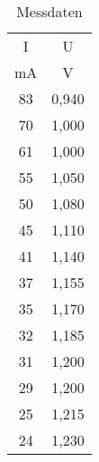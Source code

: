 

\begin{table}
  \centering
  \caption{Messdaten}
  \label{tab:some_data}
  \begin{tabular}{c c }
    \toprule
     I &	 U	   \\
     mA &  V  \\
    \midrule
   83  & 0,940	\\
   70  & 1,000	\\
   61  & 1,000	\\
   55  & 1,050	\\
   50  & 1,080	\\
   45  & 1,110	\\
   41  & 1,140	\\
   37  & 1,155	\\
   35  & 1,170	\\
   32  & 1,185	\\
   31  & 1,200 \\
   29  & 1,200 \\
   25  & 1,215	\\
   24  & 1,230	\\

    \bottomrule
  \end{tabular}
\end{table}
